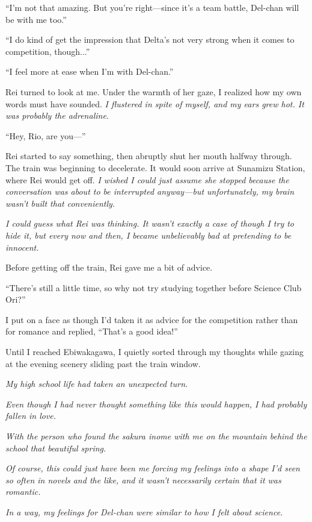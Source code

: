\documentclass[
    a4paper,
    12pt,
    twoside,
    openany,
    UTF8,
    fontset=windows
]{ctexbook}
\begin{document}
``I'm not that amazing. But you're right---since it's a team battle, Del-chan will be with me too.''

``I do kind of get the impression that Delta's not very strong when it comes to competition, though...''

``I feel more at ease when I'm with Del-chan.''

Rei turned to look at me. Under the warmth of her gaze, I realized how my own words must have sounded. \textit{I flustered in spite of myself, and my ears grew hot. It was probably the adrenaline.}

``Hey, Rio, are you---''

Rei started to say something, then abruptly shut her mouth halfway through. The train was beginning to decelerate. It would soon arrive at Sunamizu Station, where Rei would get off. \textit{I wished I could just assume she stopped because the conversation was about to be interrupted anyway---but unfortunately, my brain wasn't built that conveniently.}

\textit{I could guess what Rei was thinking. It wasn't exactly a case of though I try to hide it, but every now and then, I became unbelievably bad at pretending to be innocent.}

Before getting off the train, Rei gave me a bit of advice.

``There's still a little time, so why not try studying together before Science Club Ori?''

I put on a face as though I'd taken it as advice for the competition rather than for romance and replied, ``That's a good idea!''

Until I reached Ebiwakagawa, I quietly sorted through my thoughts while gazing at the evening scenery sliding past the train window.

\textit{My high school life had taken an unexpected turn.}

\textit{Even though I had never thought something like this would happen, I had probably fallen in love.}

\textit{With the person who found the sakura inome with me on the mountain behind the school that beautiful spring.}

\textit{Of course, this could just have been me forcing my feelings into a shape I'd seen so often in novels and the like, and it wasn't necessarily certain that it was romantic.}

\textit{In a way, my feelings for Del-chan were similar to how I felt about science.}
\end{document}
